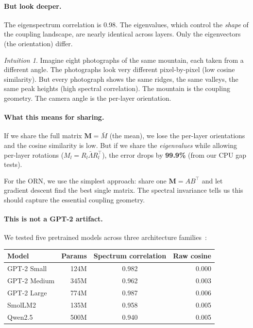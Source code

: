 \documentclass[11pt, a4paper]{article}
\newcommand{\M}{\mathbf{M}}
\theoremstyle{remark}
\newtheorem*{intuition}{Intuition}
\begin{document}
\paragraph{But look deeper.}
The eigenspectrum correlation is 0.98.
The eigenvalues, which control the \emph{shape} of the coupling landscape, are nearly identical across layers.
Only the eigenvectors (the orientation) differ.

\begin{intuition}
Imagine eight photographs of the same mountain, each taken from a different angle.
The photographs look very different pixel-by-pixel (low cosine similarity).
But every photograph shows the same ridges, the same valleys, the same peak heights (high spectral correlation).
The mountain is the coupling geometry.
The camera angle is the per-layer orientation.
\end{intuition}

\paragraph{What this means for sharing.}
If we share the full matrix $\M = \bar{M}$ (the mean), we lose the per-layer orientations and the cosine similarity is low.
But if we share the \emph{eigenvalues} while allowing per-layer rotations ($M_l = R_l \bar{\Lambda} R_l^\top$), the error drops by \textbf{99.9\%} (from our CPU gap tests).

For the ORN, we use the simplest approach: share one $\M = AB^\top$ and let gradient descent find the best single matrix.
The spectral invariance tells us this should capture the essential coupling geometry.

\paragraph{This is not a GPT-2 artifact.}
We tested five pretrained models across three architecture families~\cite{qk2024eigenspectrum, spectral2024rankcollapse}:

\begin{center}\small
\begin{tabular}{@{}lrcr@{}}
\toprule
\textbf{Model} & \textbf{Params} & \textbf{Spectrum correlation} & \textbf{Raw cosine} \\
\midrule
GPT-2 Small & 124M & 0.982 & 0.000 \\
GPT-2 Medium & 345M & 0.962 & 0.003 \\
GPT-2 Large & 774M & 0.987 & 0.006 \\
SmolLM2 & 135M & 0.958 & 0.005 \\
Qwen2.5 & 500M & 0.940 & 0.005 \\
\bottomrule
\end{tabular}
\end{center}
\end{document}
